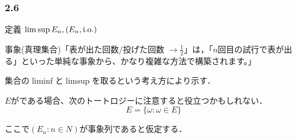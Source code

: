 \documentclass{jsarticle}
\begin{document}
\subsubsection*{2.6}
定義 $\limsup E_n,(E_n,{\rm i.o.})$

事象(真理集合)「表が出た回数/投げた回数 $\to \frac{1}{2}$」は，「$n$回目の試行で表が出る」といった単純な事象から、かなり複雑な方法で構築されます。」

集合の$\liminf$と$\limsup$を取るという考え方により示す．

$E$がである場合、次のトートロジーに注意すると役立つかもしれない．
\begin{equation}
    E=\{ \omega : \omega \in E \} \nonumber
\end{equation}

ここで$(E_n \colon n\in N)$が事象列であると仮定する．
\end{document}
